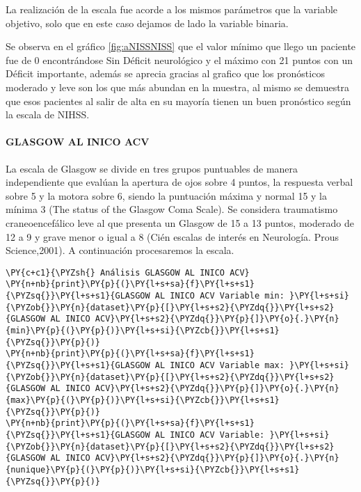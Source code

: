     La realización de la escala fue acorde a los mismos parámetros que la
variable objetivo, solo que en este caso dejamos de lado la variable
binaria.

Se observa en el gráfico \ref{fig:aNISSNISS} que el valor mínimo que llego un paciente fue de 0
encontrándose Sin Déficit neurológico y el máximo con 21 puntos con un
Déficit importante, además se aprecia gracias al grafico que los
pronósticos moderado y leve son los que más abundan en la muestra, al
mismo se demuestra que esos pacientes al salir de alta en su mayoría
tienen un buen pronóstico según la escala de NIHSS.

    \hypertarget{glasgow-al-inico-acv}{%
\paragraph{GLASGOW AL INICO ACV}\label{glasgow-al-inico-acv}}

La escala de Glasgow se divide en tres grupos puntuables de manera
independiente que evalúan la apertura de ojos sobre 4 puntos, la
respuesta verbal sobre 5 y la motora sobre 6, siendo la puntuación
máxima y normal 15 y la mínima 3 (The status of the Glasgow Coma Scale).
Se considera traumatismo craneoencefálico leve al que presenta un
Glasgow de 15 a 13 puntos, moderado de 12 a 9 y grave menor o igual a 8
(Cién escalas de interés en Neurología. Prous Science,2001). A
continuación procesaremos la escala.

    \begin{tcolorbox}[breakable, size=fbox, boxrule=1pt, pad at break*=1mm,colback=cellbackground, colframe=cellborder]
\begin{Verbatim}[commandchars=\\\{\}]
\PY{c+c1}{\PYZsh{} Análisis GLASGOW AL INICO ACV}
\PY{n+nb}{print}\PY{p}{(}\PY{l+s+sa}{f}\PY{l+s+s1}{\PYZsq{}}\PY{l+s+s1}{GLASGOW AL INICO ACV Variable min: }\PY{l+s+si}{\PYZob{}}\PY{n}{dataset}\PY{p}{[}\PY{l+s+s2}{\PYZdq{}}\PY{l+s+s2}{GLASGOW AL INICO ACV}\PY{l+s+s2}{\PYZdq{}}\PY{p}{]}\PY{o}{.}\PY{n}{min}\PY{p}{(}\PY{p}{)}\PY{l+s+si}{\PYZcb{}}\PY{l+s+s1}{\PYZsq{}}\PY{p}{)}
\PY{n+nb}{print}\PY{p}{(}\PY{l+s+sa}{f}\PY{l+s+s1}{\PYZsq{}}\PY{l+s+s1}{GLASGOW AL INICO ACV Variable max: }\PY{l+s+si}{\PYZob{}}\PY{n}{dataset}\PY{p}{[}\PY{l+s+s2}{\PYZdq{}}\PY{l+s+s2}{GLASGOW AL INICO ACV}\PY{l+s+s2}{\PYZdq{}}\PY{p}{]}\PY{o}{.}\PY{n}{max}\PY{p}{(}\PY{p}{)}\PY{l+s+si}{\PYZcb{}}\PY{l+s+s1}{\PYZsq{}}\PY{p}{)}
\PY{n+nb}{print}\PY{p}{(}\PY{l+s+sa}{f}\PY{l+s+s1}{\PYZsq{}}\PY{l+s+s1}{GLASGOW AL INICO ACV Variable: }\PY{l+s+si}{\PYZob{}}\PY{n}{dataset}\PY{p}{[}\PY{l+s+s2}{\PYZdq{}}\PY{l+s+s2}{GLASGOW AL INICO ACV}\PY{l+s+s2}{\PYZdq{}}\PY{p}{]}\PY{o}{.}\PY{n}{nunique}\PY{p}{(}\PY{p}{)}\PY{l+s+si}{\PYZcb{}}\PY{l+s+s1}{\PYZsq{}}\PY{p}{)}
\end{Verbatim}
\end{tcolorbox}

